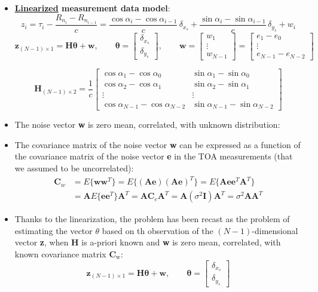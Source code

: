 \begin{itemize}
    \item \textbf{\underline{Linearized} measurement data model}:
    \[
z_i
= \tau_i - \frac{R_{n_i} - R_{n_{i-1}}}{c}
= \frac{\cos\alpha_i - \cos\alpha_{i-1}}{c}\,\delta_{x_s}
 + \frac{\sin\alpha_i - \sin\alpha_{i-1}}{c}\,\delta_{y_s}
 + w_i
\]
\[
\mathbf{z}_{(N-1)\times 1} = \mathbf{H}\boldsymbol{\theta} + \mathbf{w},
\qquad
\boldsymbol{\theta} =
\begin{bmatrix}
\delta_{x_s} \\[2pt]
\delta_{y_s}
\end{bmatrix},
\qquad
\mathbf{w} =
\begin{bmatrix}
w_1 \\ \vdots \\ w_{N-1}
\end{bmatrix}
=
\begin{bmatrix}
e_1 - e_0 \\ \vdots \\ e_{N-1} - e_{N-2}
\end{bmatrix}
\]

\[
\mathbf{H}_{(N-1)\times 2}
= \frac{1}{c}
\begin{bmatrix}
\cos\alpha_1 - \cos\alpha_0 & \sin\alpha_1 - \sin\alpha_0 \\
\cos\alpha_2 - \cos\alpha_1 & \sin\alpha_2 - \sin\alpha_1 \\
\vdots & \vdots \\
\cos\alpha_{N-1} - \cos\alpha_{N-2} &
\sin\alpha_{N-1} - \sin\alpha_{N-2}
\end{bmatrix}
\]

\item The noise vector \textbf{w} is zero mean, correlated, with unknown distribution:

\item The covariance matrix of the noise vector \textbf{w} can be expressed as a function of the covariance matrix of the noise vector \textbf{e} in the TOA measurements (that we assumed to be uncorrelated):
\begin{align*}
\mathbf{C}_w
&= E\{\mathbf{w}\mathbf{w}^{T}\}
 = E\{(\mathbf{A}\mathbf{e})(\mathbf{A}\mathbf{e})^{T}\}
 = E\{\mathbf{A}\mathbf{e}\mathbf{e}^{T}\mathbf{A}^{T}\} \\[4pt]
&= \mathbf{A}E\{\mathbf{e}\mathbf{e}^{T}\}\mathbf{A}^{T}
 = \mathbf{A}\mathbf{C}_e\mathbf{A}^{T}
 = \mathbf{A}(\sigma^{2}\mathbf{I})\mathbf{A}^{T}
 = \sigma^{2}\mathbf{A}\mathbf{A}^{T}
\end{align*}

\item Thanks to the linearization, the problem has been recast as the problem of estimating the vector \(\theta\) based on th observation of the \((N-1)\)-dimensional vector \textbf{z}, when \textbf{H} is a-priori known and \textbf{w} is zero mean, correlated, with known covariance matrix \(\mathbf{C}_\text{w}\):
\[
\mathbf{z}_{(N-1)\times 1}
= \mathbf{H}\boldsymbol{\theta} + \mathbf{w},
\qquad
\boldsymbol{\theta} =
\begin{bmatrix}
\delta_{x_s} \\[2pt]
\delta_{y_s}
\end{bmatrix}
\]


\end{itemize}
